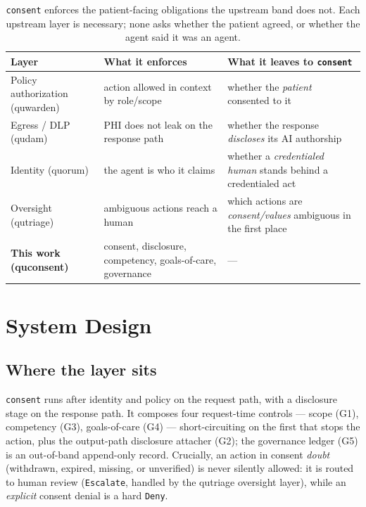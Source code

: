 \documentclass[11pt]{article}
\begin{document}
\begin{table}[htb]\centering\small
\begin{tabular}{L{3.0cm}L{4.3cm}L{4.3cm}}
\toprule
Layer & What it enforces & What it leaves to \texttt{consent} \\
\midrule
Policy authorization (quwarden) & action allowed in context by role/scope & whether the \emph{patient} consented to it \\
Egress / DLP (qudam) & PHI does not leak on the response path & whether the response \emph{discloses} its AI authorship \\
Identity (quorum) & the agent is who it claims & whether a \emph{credentialed human} stands behind a credentialed act \\
Oversight (qutriage) & ambiguous actions reach a human & which actions are \emph{consent/values} ambiguous in the first place \\
\textbf{This work (quconsent)} & consent, disclosure, competency, goals-of-care, governance & --- \\
\bottomrule
\end{tabular}
\caption{\texttt{consent} enforces the patient-facing obligations the upstream
band does not. Each upstream layer is necessary; none asks whether the patient
agreed, or whether the agent said it was an agent.}
\label{tab:positioning}
\end{table}

\section{System Design}
\subsection{Where the layer sits}
\texttt{consent} runs after identity and policy on the request path, with a
disclosure stage on the response path. It composes four request-time controls ---
scope (G1), competency (G3), goals-of-care (G4) --- short-circuiting on the first
that stops the action, plus the output-path disclosure attacher (G2); the
governance ledger (G5) is an out-of-band append-only record. Crucially, an action
in consent \emph{doubt} (withdrawn, expired, missing, or unverified) is never
silently allowed: it is routed to human review (\texttt{Escalate}, handled by the
qutriage oversight layer), while an \emph{explicit} consent denial is a hard
\texttt{Deny}.
\end{document}
